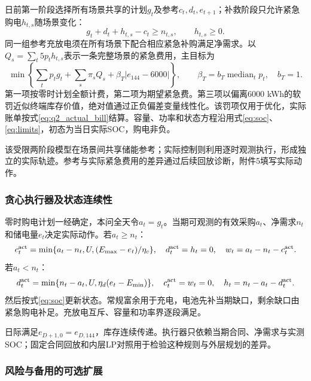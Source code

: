日前第一阶段选择所有场景共享的计划$g_t$及参考$c_t,d_t,e_{t+1}$；补救阶段只允许紧急购电$h_{t,s}$随场景变化：
\begin{equation}
 g_t+d_t+h_{t,s}-c_t\ge n_{t,s},\qquad h_{t,s}\ge0.
 \label{eq:scenario_balance}
\end{equation}
同一组参考充放电须在所有场景下配合相应紧急补购满足净需求。以
$Q_s=\sum_t5p_th_{t,s}$表示一条完整场景的紧急费用，主目标为
\begin{equation}
 \min\left\{\sum_tp_tg_t+\sum_s\pi_sQ_s+
 \beta_T|e_{144}-6000|\right\},\qquad
 \beta_T=b_T\operatorname{median}_{t}p_t,\quad b_T=1.
 \label{eq:q2_objective}
\end{equation}
第一项按零时计划全额计费，第二项为期望紧急费。第三项以偏离6000 kWh的软罚近似终端库存价值，绝对值通过正负偏差变量线性化。该罚项仅用于优化，实际账单按式\eqref{eq:q2_actual_bill}结算。容量、功率和状态方程沿用式\eqref{eq:soc}、\eqref{eq:limits}，初态为当日实际SOC，购电非负。

该受限两阶段模型在场景间共享储能参考；实际控制则利用逐时观测执行，形成独立的实际轨迹。参考与实际紧急费用的差异通过后续回放诊断，附件5填写实际动作。

\subsubsection{贪心执行器及状态连续性}

零时购电计划一经确定，本问全天令$a_t=g_t$。当期可观测的有效采购$a_t$、净需求$n_t$和储电量$e_t$决定实际动作。若$a_t\ge n_t$：
\begin{equation}
 c_t^{\rm act}=\min\{a_t-n_t,U,(E_{\max}-e_t)/\eta_c\},\quad
 d_t^{\rm act}=h_t=0,\quad w_t=a_t-n_t-c_t^{\rm act}.
 \label{eq:execute_charge}
\end{equation}
若$a_t<n_t$：
\begin{equation}
 d_t^{\rm act}=\min\{n_t-a_t,U,\eta_d(e_t-E_{\min})\},\quad
 c_t^{\rm act}=w_t=0,\quad h_t=n_t-a_t-d_t^{\rm act}.
 \label{eq:execute_discharge}
\end{equation}
然后按式\eqref{eq:soc}更新状态。常规富余用于充电，电池先补当期缺口，剩余缺口由紧急购电补足。充放电互斥、容量和功率界逐段满足。

日际满足$e_{D+1,0}=e_{D,144}$，库存连续传递。执行器只依赖当期合同、净需求与实测SOC；固定合同回放和内层LP对照用于检验这种规则与外层规划的差异。

\subsubsection{风险与备用的可选扩展}


